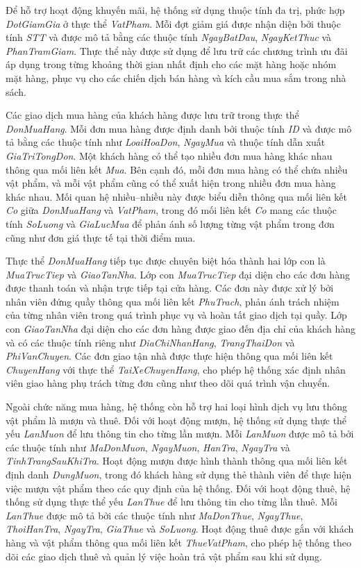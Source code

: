Để hỗ trợ hoạt động khuyến mãi, hệ thống sử dụng thuộc tính đa trị, phức hợp \textit{DotGiamGia} ở thực thể \textit{VatPham}. Mỗi đợt giảm giá được nhận diện bởi thuộc tính \textit{STT} và được mô tả bằng các thuộc tính \textit{NgayBatDau}, \textit{NgayKetThuc} và \textit{PhanTramGiam}. Thực thể này được sử dụng để lưu trữ các chương trình ưu đãi áp dụng trong từng khoảng thời gian nhất định cho các mặt hàng hoặc nhóm mặt hàng, phục vụ cho các chiến dịch bán hàng và kích cầu mua sắm trong nhà sách.

Các giao dịch mua hàng của khách hàng được lưu trữ trong thực thể \textit{DonMuaHang}. Mỗi đơn mua hàng được định danh bởi thuộc tính \textit{ID} và được mô tả bằng các thuộc tính như \textit{LoaiHoaDon}, \textit{NgayMua} và thuộc tính dẫn xuất \textit{GiaTriTongDon}. Một khách hàng có thể tạo nhiều đơn mua hàng khác nhau thông qua mối liên kết \textit{Mua}. Bên cạnh đó, mỗi đơn mua hàng có thể chứa nhiều vật phẩm, và mỗi vật phẩm cũng có thể xuất hiện trong nhiều đơn mua hàng khác nhau. Mối quan hệ nhiều--nhiều này được biểu diễn thông qua mối liên kết \textit{Co} giữa \textit{DonMuaHang} và \textit{VatPham}, trong đó mối liên kết \textit{Co} mang các thuộc tính \textit{SoLuong} và \textit{GiaLucMua} để phản ánh số lượng từng vật phẩm trong đơn cũng như đơn giá thực tế tại thời điểm mua.

Thực thể \textit{DonMuaHang} tiếp tục được chuyên biệt hóa thành hai lớp con là \textit{MuaTrucTiep} và \textit{GiaoTanNha}. Lớp con \textit{MuaTrucTiep} đại diện cho các đơn hàng được thanh toán và nhận trực tiếp tại cửa hàng. Các đơn này được xử lý bởi nhân viên đứng quầy thông qua mối liên kết \textit{PhuTrach}, phản ánh trách nhiệm của từng nhân viên trong quá trình phục vụ và hoàn tất giao dịch tại quầy. Lớp con \textit{GiaoTanNha} đại diện cho các đơn hàng được giao đến địa chỉ của khách hàng và có các thuộc tính riêng như \textit{DiaChiNhanHang}, \textit{TrangThaiDon} và \textit{PhiVanChuyen}. Các đơn giao tận nhà được thực hiện thông qua mối liên kết \textit{ChuyenHang} với thực thể \textit{TaiXeChuyenHang}, cho phép hệ thống xác định nhân viên giao hàng phụ trách từng đơn cũng như theo dõi quá trình vận chuyển.

Ngoài chức năng mua hàng, hệ thống còn hỗ trợ hai loại hình dịch vụ lưu thông vật phẩm là mượn và thuê. Đối với hoạt động mượn, hệ thống sử dụng thực thể yếu \textit{LanMuon} để lưu thông tin cho từng lần mượn. Mỗi \textit{LanMuon} được mô tả bởi các thuộc tính như \textit{MaDonMuon}, \textit{NgayMuon}, \textit{HanTra}, \textit{NgayTra} và \textit{TinhTrangSauKhiTra}. Hoạt động mượn được hình thành thông qua mối liên kết định danh \textit{DungMuon}, trong đó khách hàng sử dụng thẻ thành viên để thực hiện việc mượn vật phẩm theo các quy định của hệ thống. Đối với hoạt động thuê, hệ thống sử dụng thực thể yếu \textit{LanThue} để lưu thông tin cho từng lần thuê. Mỗi \textit{LanThue} được mô tả bởi các thuộc tính như \textit{MaDonThue}, \textit{NgayThue}, \textit{ThoiHanTra}, \textit{NgayTra}, \textit{GiaThue} và \textit{SoLuong}. Hoạt động thuê được gắn với khách hàng và vật phẩm thông qua mối liên kết \textit{ThueVatPham}, cho phép hệ thống theo dõi các giao dịch thuê và quản lý việc hoàn trả vật phẩm sau khi sử dụng.

